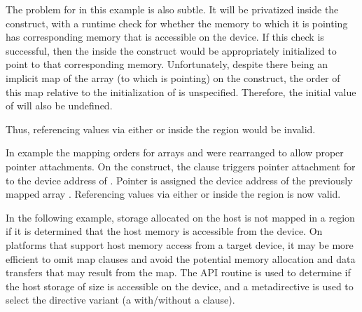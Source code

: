 The problem for  in this example is also subtle. It will be privatized
inside the  construct, with a runtime check for whether the memory
to which it is pointing has corresponding memory that is accessible on the
device. If this check is successful, then the  inside the construct
would be appropriately initialized to point to that corresponding memory.
Unfortunately, despite there being an implicit map of the array  (to
which  is pointing) on the construct, the order of this map relative to
the initialization of  is unspecified. Therefore, the initial value of
 will also be undefined.

Thus, referencing values via either  or  inside
the  region would be invalid.


In example  the mapping orders for arrays 
and  were rearranged to allow proper pointer attachments.
On the  construct, the  clause triggers pointer
attachment for  to the device address of . 
Pointer  is assigned the device address of the previously mapped
 array .
Referencing values via either  or  inside the  region is now valid.


In the following example, storage allocated on the host is not mapped in a 
region if it is determined that the host memory is accessible from the device.
On platforms that support host memory access from a target device, 
it may be more efficient to omit map clauses and avoid the potential memory allocation 
and data transfers that may result from the map.
The  API routine is used to determine if the 
host storage of size  is accessible on the device, and a metadirective
is used to select the directive variant (a  with/without a  clause).

